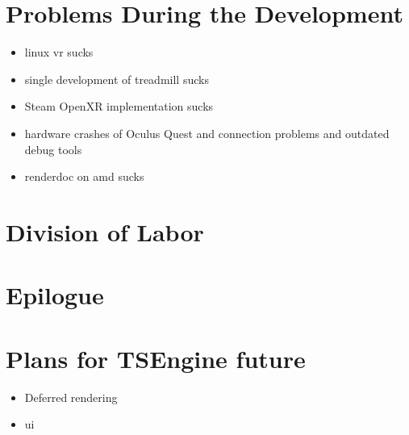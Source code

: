 \newpage
\section{Problems During the Development}
\label{sec:problems}
\begin{itemize}
    \item linux vr sucks
    \item single development of treadmill sucks
    \item Steam OpenXR implementation sucks
    \item hardware crashes of Oculus Quest and connection problems and outdated debug tools
    \item renderdoc on amd sucks
\end{itemize}
\newpage
\section{Division of Labor}
\section{Epilogue}
\section{Plans for TSEngine future}
\begin{itemize}
    \item Deferred rendering
    \item ui
\end{itemize}